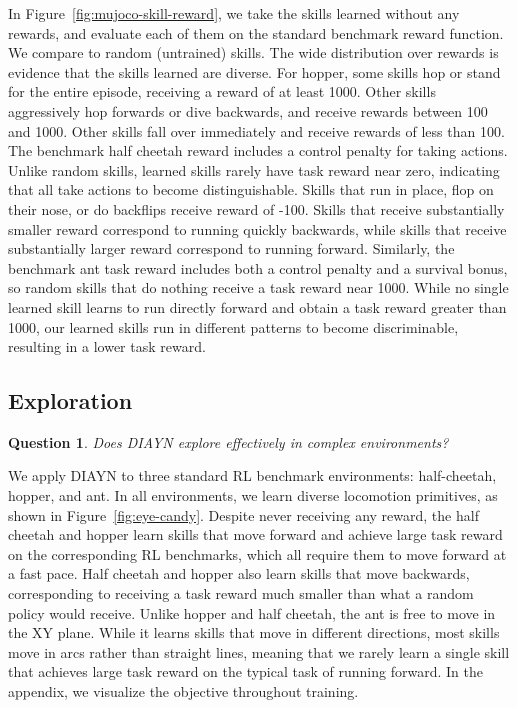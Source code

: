 \documentclass{article} %
\theoremstyle{questionstyle}\newtheorem{question}{Question}
\begin{document}
In Figure~\ref{fig:mujoco-skill-reward}, we take the skills learned without any rewards, and evaluate each of them on the standard benchmark reward function. We compare to random (untrained) skills. The wide distribution over rewards is evidence that the skills learned are diverse.
For hopper, some skills hop or stand for the entire episode, receiving a reward of at least 1000. Other skills aggressively hop forwards or dive backwards, and receive rewards between 100 and 1000. Other skills fall over immediately and receive rewards of less than 100.
The benchmark half cheetah reward includes a control penalty for taking actions. Unlike random skills, learned skills rarely have task reward near zero, indicating that all take actions to become distinguishable. Skills that run in place, flop on their nose, or do backflips receive reward of -100. Skills that receive substantially smaller reward correspond to running quickly backwards, while skills that receive substantially larger reward correspond to running forward.
Similarly, the benchmark ant task reward includes both a control penalty and a survival bonus, so random skills that do nothing receive a task reward near 1000. While no single learned skill learns to run directly forward and obtain a task reward greater than 1000, our learned skills run in different patterns to become discriminable, resulting in a lower task reward.

\subsection{Exploration}
\label{appendix:exploration}

\begin{question}
Does DIAYN explore effectively in complex environments?
\end{question}

We apply DIAYN to three standard RL benchmark environments: half-cheetah, hopper, and ant. In all environments, we learn diverse locomotion primitives, as shown in Figure~\ref{fig:eye-candy}. Despite never receiving any reward, the half cheetah and hopper learn skills that move forward and achieve large task reward on the corresponding RL benchmarks, which all require them to move forward at a fast pace. Half cheetah and hopper also learn skills that move backwards, corresponding to receiving a task reward much smaller than what a random policy would receive.
Unlike hopper and half cheetah, the ant is free to move in the XY plane. While it learns skills that move in different directions, most skills move in arcs rather than straight lines, meaning that we rarely learn a single skill that achieves large task reward on the typical task of running forward. In the appendix, we visualize the objective throughout training.
\end{document}
